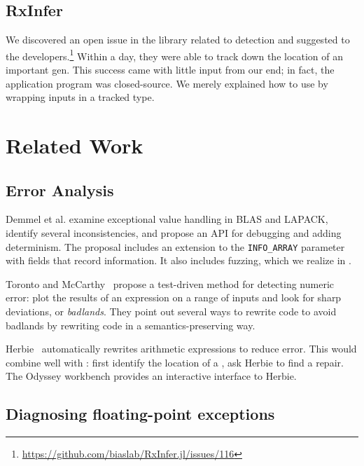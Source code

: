 \documentclass{juliacon}
\begin{document}
\subsection{RxInfer}
\label{s:safari}

We discovered an open issue in the  library related to \NaN{} detection
and suggested \FT{} to the developers.\footnote{\url{https://github.com/biaslab/RxInfer.jl/issues/116}}
Within a day, they were able to track down the location of an important \NaN{} gen.
This success came with little input from our end; in fact, the application program was
closed-source.
We merely explained how to use \FT{} by wrapping inputs in a tracked type.


\section{Related Work}
\label{s:related}

\subsection{Error Analysis}

Demmel et al.\cite{ddghlllprr-correctness-2022} examine \fp{} exceptional value handling in BLAS and LAPACK, identify several inconsistencies, and propose an API for debugging and adding determinism.
The proposal includes an extension to the \texttt{INFO\_ARRAY} parameter with fields that record \genpropkill{} information.
It also includes fuzzing, which we realize in \FT{}.

Toronto and McCarthy~\cite{torontoPracticallyAccurateFloatingPoint2014} propose a test-driven method for detecting numeric error: plot the results of an expression on a range of inputs and look for sharp deviations, or \emph{badlands}.
They point out several ways to rewrite code to avoid badlands by rewriting code in a semantics-preserving way.

Herbie~\cite{panchekhaAutomaticallyImprovingAccuracy2015} automatically rewrites arithmetic expressions to reduce \fp{} error.
This would combine well with \FT{}: first identify the location of a \NaN{}, ask Herbie to find a repair.
The Odyssey\cite{misbackOdysseyInteractiveWorkbench2023} workbench provides an interactive interface to Herbie.


\subsection{Diagnosing floating-point exceptions}
\end{document}
